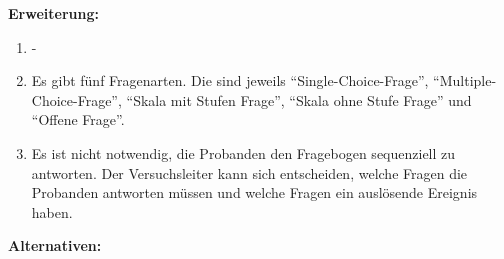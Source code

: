 \documentclass[a4paper]{scrreprt}
\begin{document}
\begin{itemize}
                \par \textbf{Erweiterung: }
                \begin{enumerate}
                    \item -
                    \item Es gibt fünf Fragenarten. Die sind jeweils ``Single-Choice-Frage'', ``Multiple-Choice-Frage'', ``Skala mit Stufen Frage'', ``Skala ohne Stufe Frage'' und ``Offene Frage''.
                    \item Es ist nicht notwendig, die Probanden den Fragebogen sequenziell zu antworten. Der Versuchsleiter kann sich entscheiden, welche Fragen die Probanden antworten müssen und welche Fragen ein auslösende Ereignis haben.
                \end{enumerate}
                \par \textbf{Alternativen: }



\end{itemize}
\end{document}
